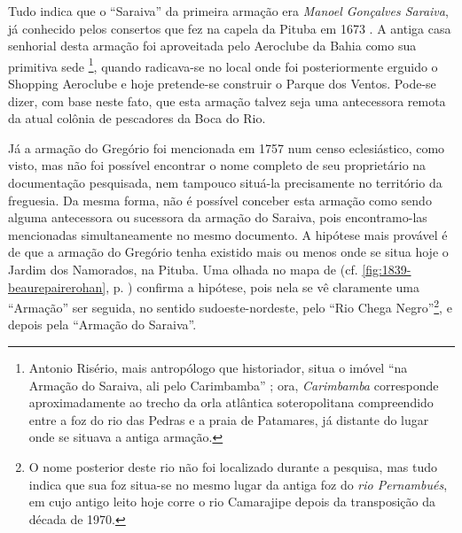 Tudo indica que o ``Saraiva'' da primeira armação era \textit{Manoel Gonçalves Saraiva}, já conhecido pelos consertos que fez na capela da Pituba em 1673 \cite[p.~11]{ott_engenhos_1996}. A antiga casa senhorial desta armação foi aproveitada pelo Aeroclube da Bahia como sua primitiva sede \cite[p.~III-11, verso]{teixeira_doacoes_1978}\footnote{Antonio Risério, mais antropólogo que historiador, situa o imóvel ``na Armação do Saraiva, ali pelo Carimbamba'' \cite{riserio_histba_2004}; ora, \textit{Carimbamba} corresponde aproximadamente ao trecho da orla atlântica soteropolitana compreendido entre a foz do rio das Pedras e a praia de Patamares, já distante do lugar onde se situava a antiga armação.}, quando radicava-se no local onde foi posteriormente erguido o Shopping Aeroclube e hoje pretende-se construir o Parque dos Ventos. Pode-se dizer, com base neste fato, que esta armação talvez seja uma antecessora remota da atual colônia de pescadores da Boca do Rio.

Já a armação do Gregório foi mencionada em 1757 num censo eclesiástico, como visto, mas não foi possível encontrar o nome completo de seu proprietário na documentação pesquisada, nem tampouco situá-la precisamente no território da freguesia. Da mesma forma, não é possível conceber esta armação como sendo alguma antecessora ou sucessora da armação do Saraiva, pois encontramo-las mencionadas simultaneamente no mesmo documento. A hipótese mais provável é de que a armação do Gregório tenha existido mais ou menos onde se situa hoje o Jardim dos Namorados, na Pituba. Uma olhada no mapa de  (cf. \autoref{fig:1839-beaurepairerohan}, p. \pageref{fig:1839-beaurepairerohan}) confirma a hipótese, pois nela se vê claramente uma ``Armação'' ser seguida, no sentido sudoeste-nordeste, pelo ``Rio Chega Negro''\footnote{O nome posterior deste rio não foi localizado durante a pesquisa, mas tudo indica que sua foz situa-se no mesmo lugar da antiga foz do \textit{rio Pernambués}, em cujo antigo leito hoje corre o rio Camarajipe depois da transposição da década de 1970.}, e depois pela ``Armação do Saraiva''.


